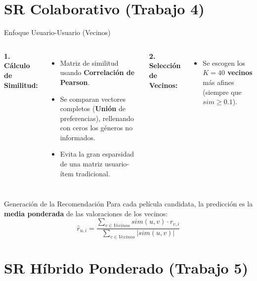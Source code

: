 \documentclass[aspectratio=169]{beamer}
\begin{document}
\section{SR Colaborativo (Trabajo 4)}

\begin{frame}{Enfoque Usuario-Usuario (Vecinos)}
  \begin{columns}[T]
      \textbf{1. Cálculo de Similitud:}
      \begin{itemize}
        \item Matriz de similitud usando \textbf{Correlación de Pearson}.
        \item Se comparan vectores completos (\textbf{Unión} de preferencias), rellenando con ceros los géneros no informados.
        \item Evita la gran esparsidad de una matriz usuario-ítem tradicional.
      \end{itemize}

      \textbf{2. Selección de Vecinos:}
      \begin{itemize}
        \item Se escogen los \textbf{$K=40$ vecinos} más afines (siempre que $sim \geq 0.1$).
      \end{itemize}
  \end{columns}

  \vspace{0.3cm}
  \begin{block}{Generación de la Recomendación}
    Para cada película candidata, la predicción es la \textbf{media ponderada} de las valoraciones de los vecinos:
    \[
      \hat{r}_{u,i} = \frac{\sum_{v \in Vecinos} sim(u,v) \cdot r_{v,i}}{\sum_{v \in Vecinos} |sim(u,v)|}
    \]
  \end{block}
\end{frame}

\section{SR Híbrido Ponderado (Trabajo 5)}
\end{document}
